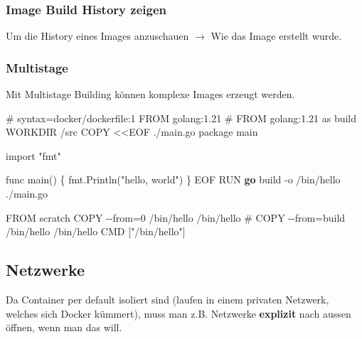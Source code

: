 \documentclass[
  10pt,
  a4paper,
]{article}
\newenvironment{Shaded}{}{}
\newcommand{\AttributeTok}[1]{\textcolor[rgb]{0.84,0.23,0.29}{#1}}
\newcommand{\CommentTok}[1]{\textcolor[rgb]{0.42,0.45,0.49}{#1}}
\newcommand{\CommentVarTok}[1]{\textcolor[rgb]{0.42,0.45,0.49}{#1}}
\newcommand{\ExtensionTok}[1]{\textcolor[rgb]{0.84,0.23,0.29}{\textbf{#1}}}
\newcommand{\KeywordTok}[1]{\textcolor[rgb]{0.84,0.23,0.29}{#1}}
\newcommand{\NormalTok}[1]{\textcolor[rgb]{0.14,0.16,0.18}{#1}}
\newcommand{\OperatorTok}[1]{\textcolor[rgb]{0.14,0.16,0.18}{#1}}
\newcommand{\StringTok}[1]{\textcolor[rgb]{0.01,0.18,0.38}{#1}}
\begin{document}
\begin{multicols*}{2}
\subsubsection{Image Build History
zeigen}\label{image-build-history-zeigen}

Um die History eines Images anzuschauen \(\rightarrow\) Wie das Image
erstellt wurde.

\begin{Shaded}
\end{Shaded}

\subsubsection{Multistage}\label{multistage}

Mit Multistage Building können komplexe Images erzeugt werden.

\begin{Shaded}
\begin{Highlighting}[]
\CommentTok{\# }\CommentVarTok{syntax=docker/dockerfile:1}
\KeywordTok{FROM}\NormalTok{ golang:1.21}
\CommentTok{\# FROM golang:1.21 as build}
\KeywordTok{WORKDIR}\NormalTok{ /src}
\KeywordTok{COPY}\NormalTok{ \textless{}\textless{}EOF ./main.go}
\NormalTok{package main}

\NormalTok{import }\StringTok{"fmt"}

\NormalTok{func main() \{}
\NormalTok{  fmt.Println(}\StringTok{"hello, world"}\NormalTok{)}
\NormalTok{\}}
\NormalTok{EOF}
\KeywordTok{RUN} \ExtensionTok{go}\NormalTok{ build }\AttributeTok{{-}o}\NormalTok{ /bin/hello ./main.go}

\KeywordTok{FROM}\NormalTok{ scratch}
\KeywordTok{COPY} \OperatorTok{{-}{-}from=0}\NormalTok{ /bin/hello /bin/hello}
\CommentTok{\# COPY {-}{-}from=build /bin/hello /bin/hello}
\KeywordTok{CMD}\NormalTok{ [}\StringTok{"/bin/hello"}\NormalTok{]}
\end{Highlighting}
\end{Shaded}

\subsection{Netzwerke}\label{netzwerke}

Da Container per default isoliert sind (laufen in einem privaten
Netzwerk, welches sich Docker kümmert), muss man z.B. Netzwerke
\textbf{explizit} nach aussen öffnen, wenn man das will.


\end{multicols*}
\end{document}
